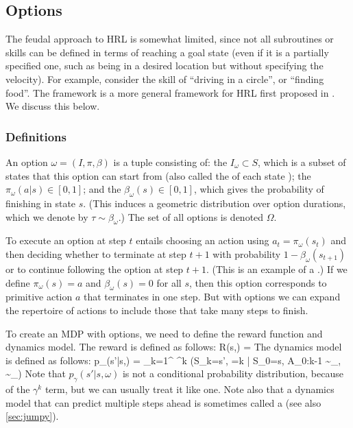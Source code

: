 \subsection{Options}
\label{sec:options}

The feudal approach to HRL is somewhat limited,
since not all subroutines or skills can be defined in terms
of reaching a goal state (even if it is a partially
specified one, such as being in a desired location
but without specifying the velocity).
For example, consider the skill of
``driving in a circle'', or ``finding food''.
The  framework  is a
more general framework for HRL first proposed in
\citep{options}.
We discuss this below.

\subsubsection{Definitions}

An option $\omega=(I,\pi,\beta)$ is a tuple consisting of:
the  $I_{\omega} \subset S$,
which is a subset of states that this option can start from
(also called the  of  each state
\citep{Khetarpal2020});
the  $\pi_{\omega}(a|s) \in [0,1]$;
and the 
$\beta_{\omega}(s) \in [0,1]$,
which gives the probability of finishing in state $s$.
(This induces a geometric distribution over option durations,
which we denote by $\tau \sim \beta_{\omega}$.)
The set of all options is denoted $\Omega$.

To execute an option at step $t$ entails choosing an action using
$a_t = \pi_{\omega}(s_t)$ and then deciding whether
to terminate at step $t+1$ with probability
$1-\beta_{\omega}(s_{t+1})$ or to continue following the option at step $t+1$.
(This is an example of a 
\citep{Puterman94}.)
If we define $\pi_{\omega}(s)=a$ and $\beta_{\omega}(s)=0$ for all $s$, then
this option corresponds to primitive action $a$ that terminates in one step.
But with options we can expand the repertoire of actions to include those that
take many steps to finish.

To create an MDP with options, we need to define the reward function
and dynamics model. The reward is defined as follows:
\be
R(s,\omega) = 
\ee
The dynamics model is defined as follows:
\be
p_{\gamma}(s'|s,\omega) = \sum_{k=1}^{\infty}
\gamma^k \Pr\left(S_k=s', \tau=k | S_0=s, A_{0:k-1} \sim \pi_{\omega},
\tau \sim \beta_{\omega}\right)
\ee
Note that $p_{\gamma}(s'|s,\omega)$ is not a conditional probability distribution,
because of the $\gamma^k$ term,
but we can usually treat it like one.
Note also that a dynamics model  that can predict multiple steps ahead
is sometimes called a 
(see also \cref{sec:jumpy}).



